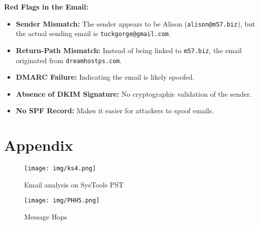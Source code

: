\documentclass{article}
\begin{document}
\textbf{Red Flags in the Email:}
\begin{itemize}
    \item \textbf{Sender Mismatch:} The sender appears to be Alison (\texttt{alison@m57.biz}), but the actual sending email is \texttt{tuckgorge@gmail.com}.
    \item \textbf{Return-Path Mismatch:} Instead of being linked to \texttt{m57.biz}, the email originated from \texttt{dreamhostps.com}.
    \item \textbf{DMARC Failure:} Indicating the email is likely spoofed.
    \item \textbf{Absence of DKIM Signature:} No cryptographic validation of the sender.
    \item \textbf{No SPF Record:} Makes it easier for attackers to spoof emails.
\end{itemize}

\newpage
\section*{Appendix}
\begin{figure}[h]
    \centering
    \texttt{[image: img/ks4.png]}
    \caption{Email analysis on SysTools PST}
    \label{fig:phishing_signs}
\end{figure}

\vspace{1.5cm}

\begin{figure}[h]
    \centering
    \texttt{[image: img/PHH5.png]}
    \caption{Message Hops}
    \label{fig:phishing_signs}
\end{figure}
\end{document}
